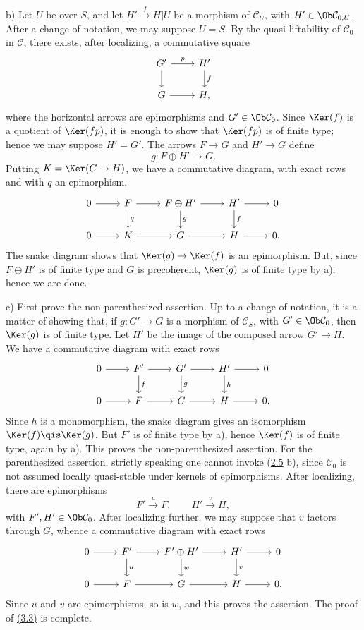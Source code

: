 b) Let \(U\) be over \(S\), and let \(H'\xrightarrow{f}H|U\) be a morphism of \(\mathcal C_U\), with \(H'\in\Ob\mathcal C_{0,U}\). After a change of notation, we may suppose \(U=S\). By the quasi-liftability of \(\mathcal C_0\) in \(\mathcal C\), there exists, after localizing, a commutative square
\[
\begin{tikzcd}
G' \arrow[r,"p"] \arrow[d] & H' \arrow[d,"f"]\\
G \arrow[r] & H,
\end{tikzcd}
\]
where the horizontal arrows are epimorphisms and \(G'\in\Ob\mathcal C_0\). Since \(\Ker(f)\) is a quotient of \(\Ker(fp)\), it is enough to show that \(\Ker(fp)\) is of finite type; hence we may suppose \(H'=G'\). The arrows \(F\to G\) and \(H'\to G\) define
\[
  g:F\oplus H'\longrightarrow G.
\]
Putting \(K=\Ker(G\to H)\), we have a commutative diagram, with exact rows and with \(q\) an epimorphism,
\[
\begin{tikzcd}
0\arrow[r]&F\arrow[r]\arrow[d,"q"]&F\oplus H'\arrow[r]\arrow[d,"g"]&H'\arrow[r]\arrow[d,"f"]&0\\
0\arrow[r]&K\arrow[r]&G\arrow[r]&H\arrow[r]&0 .
\end{tikzcd}
\]
The snake diagram shows that \(\Ker(g)\to\Ker(f)\) is an epimorphism. But, since \(F\oplus H'\) is of finite type and \(G\) is precoherent, \(\Ker(g)\) is of finite type by a); hence we are done.

c) First prove the non-parenthesized assertion. Up to a change of notation, it is a matter of showing that, if \(g:G'\to G\) is a morphism of \(\mathcal C_S\), with \(G'\in\Ob\mathcal C_0\), then \(\Ker(g)\) is of finite type. Let \(H'\) be the image of the composed arrow \(G'\to H\). We have a commutative diagram with exact rows
\[
\begin{tikzcd}
0\arrow[r]&F'\arrow[r]\arrow[d,"f"]&G'\arrow[r]\arrow[d,"g"]&H'\arrow[r]\arrow[d,"h"]&0\\
0\arrow[r]&F\arrow[r]&G\arrow[r]&H\arrow[r]&0 .
\end{tikzcd}
\]
Since \(h\) is a monomorphism, the snake diagram gives an isomorphism \(\Ker(f)\qis\Ker(g)\). But \(F'\) is of finite type by a), hence \(\Ker(f)\) is of finite type, again by a). This proves the non-parenthesized assertion. For the parenthesized assertion, strictly speaking one cannot invoke (\hyperlink{sga6.e01.prop.2-5}{2.5} b), since \(\mathcal C_0\) is not assumed locally quasi-stable under kernels of epimorphisms. After localizing, there are epimorphisms
\[
  F'\xrightarrow{u}F,
  \qquad H'\xrightarrow{v}H,
\]
with \(F',H'\in\Ob\mathcal C_0\). After localizing further, we may suppose that \(v\) factors through \(G\), whence a commutative diagram with exact rows
\[
\begin{tikzcd}
0\arrow[r]&F'\arrow[r]\arrow[d,"u"]&F'\oplus H'\arrow[r]\arrow[d,"w"]&H'\arrow[r]\arrow[d,"v"]&0\\
0\arrow[r]&F\arrow[r]&G\arrow[r]&H\arrow[r]&0 .
\end{tikzcd}
\]
Since \(u\) and \(v\) are epimorphisms, so is \(w\), and this proves the assertion. The proof of \hyperlink{sga6.e01.lem.3-3}{(3.3)} is complete.

